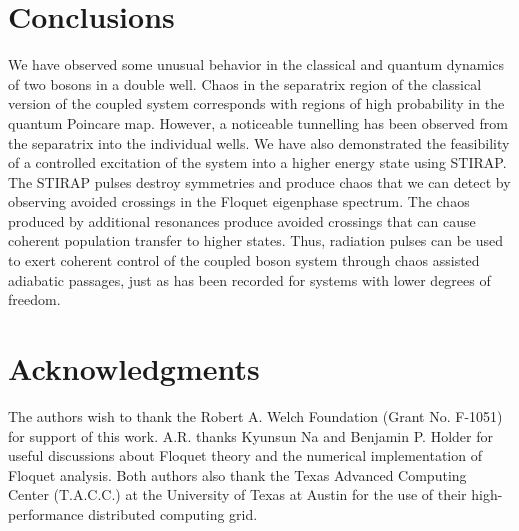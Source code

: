 \documentclass{article}
\begin{document}
\section{Conclusions}
%
%
We have observed some unusual behavior in the classical and quantum dynamics of two bosons in a double well. Chaos in the separatrix region of the classical version of the coupled system corresponds with regions of high probability in the quantum Poincare map. However, a noticeable tunnelling has been observed from the separatrix into the individual wells. We have also demonstrated the feasibility of a controlled excitation of the system into a higher energy state using STIRAP. The STIRAP pulses destroy symmetries and produce chaos that we can detect by observing avoided crossings in the Floquet eigenphase spectrum. The chaos produced by additional resonances produce avoided crossings that can cause coherent population transfer to higher states. Thus, radiation pulses can be used to exert coherent control of the coupled boson system through chaos assisted adiabatic passages, just as has been recorded for systems with lower degrees of freedom.

%
%
\section{Acknowledgments}
%
%

The authors wish to thank the Robert A. Welch Foundation (Grant No. F-1051) for support of this work. A.R. thanks Kyunsun Na and Benjamin P. Holder for useful discussions about Floquet theory and the numerical implementation of Floquet analysis. Both authors also thank the Texas Advanced Computing Center (T.A.C.C.) at the University of Texas at Austin for the use of their high-performance distributed computing grid.
\end{document}
